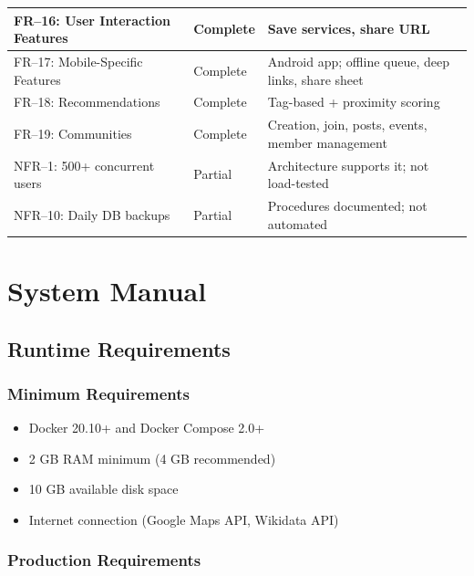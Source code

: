 \documentclass[11pt,a4paper]{report}
\begin{document}
\begin{longtable}{|p{5.5cm}|p{2cm}|p{6cm}|}
    \hline
    FR--16: User Interaction Features & Complete        & Save services, share URL                              \\
    \hline
    FR--17: Mobile-Specific Features  & Complete        & Android app; offline queue, deep links, share sheet   \\
    \hline
    FR--18: Recommendations           & Complete        & Tag-based + proximity scoring                         \\
    \hline
    FR--19: Communities               & Complete        & Creation, join, posts, events, member management      \\
    \hline
    NFR--1: 500+ concurrent users     & Partial         & Architecture supports it; not load-tested             \\
    \hline
    NFR--10: Daily DB backups         & Partial         & Procedures documented; not automated                  \\
    \hline
\end{longtable}

\chapter{System Manual}

\section{Runtime Requirements}

\subsection{Minimum Requirements}

\begin{itemize}
    \item Docker 20.10+ and Docker Compose 2.0+
    \item 2 GB RAM minimum (4 GB recommended)
    \item 10 GB available disk space
    \item Internet connection (Google Maps API, Wikidata API)
\end{itemize}

\subsection{Production Requirements}
\end{document}
